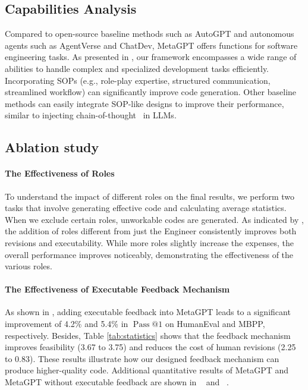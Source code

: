 \subsection{Capabilities Analysis}
Compared to open-source baseline methods such as AutoGPT and autonomous agents such as AgentVerse and ChatDev, MetaGPT offers functions for software engineering tasks.
%
As presented in , our framework encompasses a wide range of abilities to handle complex and specialized development tasks efficiently.
% 
Incorporating SOPs (e.g., role-play expertise, structured communication, streamlined workflow) can significantly improve code generation. Other baseline methods can easily integrate SOP-like designs to improve their performance, similar to injecting chain-of-thought~\citep{wei2022chain} in LLMs.

\subsection{Ablation study}
\paragraph{The Effectiveness of Roles}

To understand the impact of different roles on the final results, we perform two tasks that involve generating effective code and calculating average statistics. When we exclude certain roles, unworkable codes are generated. 
%
As indicated by , the addition of roles different from just the Engineer consistently improves both revisions and executability. 
%
While more roles slightly increase the expenses, the overall performance improves noticeably, demonstrating the effectiveness of the various roles.
%

\paragraph{The Effectiveness of Executable Feedback Mechanism}
As shown in , adding executable feedback into MetaGPT leads to a significant improvement of 4.2\% and 5.4\% in  $\operatorname{Pass} @ 1$ on HumanEval and MBPP, respectively.
%
Besides, Table \ref{tab:statistics} shows that the feedback mechanism improves feasibility (3.67 to 3.75) and reduces the cost of human revisions (2.25 to 0.83).
%
These results illustrate how our designed feedback mechanism can produce higher-quality code.
% 
Additional quantitative results of MetaGPT and MetaGPT without executable feedback are shown in ~ and ~.
